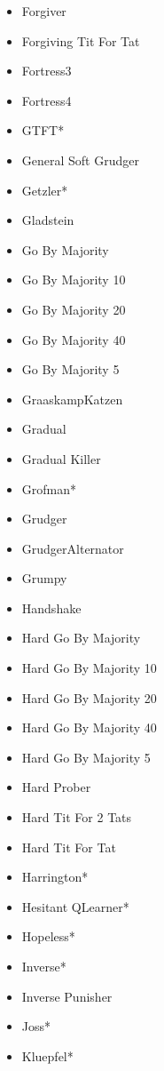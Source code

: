 \begin{appendices}
\begin{multicols}{4}
\begin{itemize}
            \item Forgiver
            \item Forgiving Tit For Tat
            \item Fortress3
            \item Fortress4
            \item GTFT*
            \item General Soft Grudger
            \item Getzler*
            \item Gladstein
            \item Go By Majority
            \item Go By Majority 10
            \item Go By Majority 20
            \item Go By Majority 40
            \item Go By Majority 5
            \item GraaskampKatzen
            \item Gradual
            \item Gradual Killer
            \item Grofman*
            \item Grudger
            \item GrudgerAlternator
            \item Grumpy
            \item Handshake
            \item Hard Go By Majority
            \item Hard Go By Majority 10
            \item Hard Go By Majority 20
            \item Hard Go By Majority 40
            \item Hard Go By Majority 5
            \item Hard Prober
            \item Hard Tit For 2 Tats
            \item Hard Tit For Tat
            \item Harrington*
            \item Hesitant QLearner*
            \item Hopeless*
            \item Inverse*
            \item Inverse Punisher
            \item Joss*
            \item Kluepfel*

\end{itemize}
\end{multicols}
\end{appendices}

